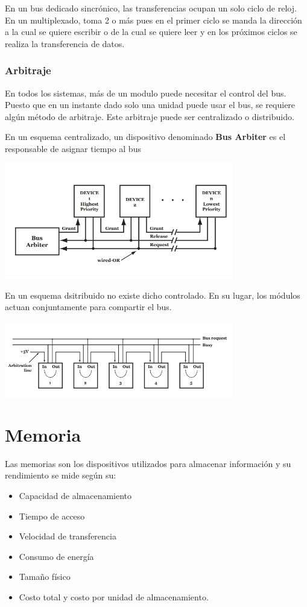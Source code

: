 En un bus dedicado sincrónico, las transferencias ocupan un solo ciclo de reloj. En un multiplexado, toma 2 o más pues en el primer ciclo se manda la dirección a la cual se quiere escribir o de la cual se quiere leer y en los próximos ciclos se realiza la transferencia de datos.

\subsubsection{Arbitraje}
En todos los sistemas, más de un modulo puede necesitar el control del bus. Puesto que en un instante dado solo una unidad puede usar el bus, se requiere algún método de arbitraje. Este arbitraje puede ser centralizado o distribuido.

En un esquema centralizado, un dispositivo denominado \textbf{Bus Arbiter} es el responsable de asignar tiempo al bus

\begin{center}
	\includegraphics[width=10cm, keepaspectratio=yes]{imagenes/bus_arbitro.PNG}
\end{center}

En un esquema dsitribuido no existe dicho controlado. En su lugar, los módulos actuan conjuntamente para compartir el bus.

\begin{center}
	\includegraphics[width=10cm, keepaspectratio=yes]{imagenes/bus_no_arbitro.PNG}
\end{center}

\newpage

\section{Memoria}
Las memorias son los dispositivos utilizados para almacenar información y su rendimiento se mide según su:
\begin{itemize}
	\item Capacidad de almacenamiento
	\item Tiempo de acceso
	\item Velocidad de transferencia
	\item Consumo de energía
	\item Tamaño físico
	\item Costo total y costo por unidad de almacenamiento.
\end{itemize}

